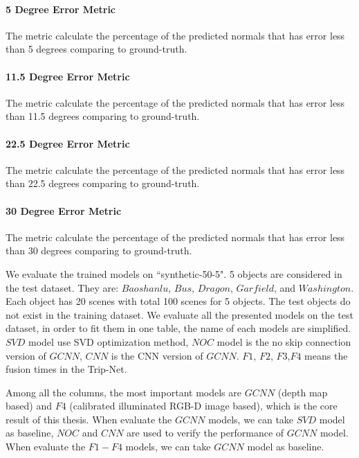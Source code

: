 \documentclass[border=15pt, multi, tikz]{article}
\begin{document}
\paragraph{5 Degree Error Metric}
The metric calculate the percentage of the predicted normals that has error less than 5 degrees comparing to ground-truth.
\paragraph{11.5 Degree Error Metric}
The metric calculate the percentage of the predicted normals that has error less than 11.5 degrees comparing to ground-truth.
\paragraph{22.5 Degree Error Metric}
The metric calculate the percentage of the predicted normals that has error less than 22.5 degrees comparing to ground-truth.
\paragraph{30 Degree Error Metric}
The metric calculate the percentage of the predicted normals that has error less than 30 degrees comparing to ground-truth.

We evaluate the trained models on ``synthetic-50-5". 5 objects are considered in the test dataset. They are: $ Baoshanlu $, $ Bus $, $ Dragon $, $ Garfield $, and $ Washington $. Each object has 20 scenes with total 100 scenes for 5 objects. The test objects do not exist in the training dataset. We evaluate all the presented models on the test dataset, in order to fit them in one table, the name of each models are simplified. $ SVD $ model use SVD optimization method, $ NOC $ model is the no skip connection version of $ GCNN $, $ CNN $ is the CNN version of $ GCNN $. $ F1 $, $ F2 $, $ F3 $,$ F4 $ means the fusion times in the Trip-Net. 

Among all the columns, the most important models are $ GCNN $ (depth map based) and  $ F4 $ (calibrated illuminated RGB-D image based), which is the core result of this thesis. When evaluate the $ GCNN $ models, we can take $ SVD $ model as baseline, $ NOC $ and $ CNN $ are used to verify the performance of $ GCNN $ model. When evaluate the $ F1-F4 $ models, we can take $ GCNN $ model as baseline.
\end{document}
